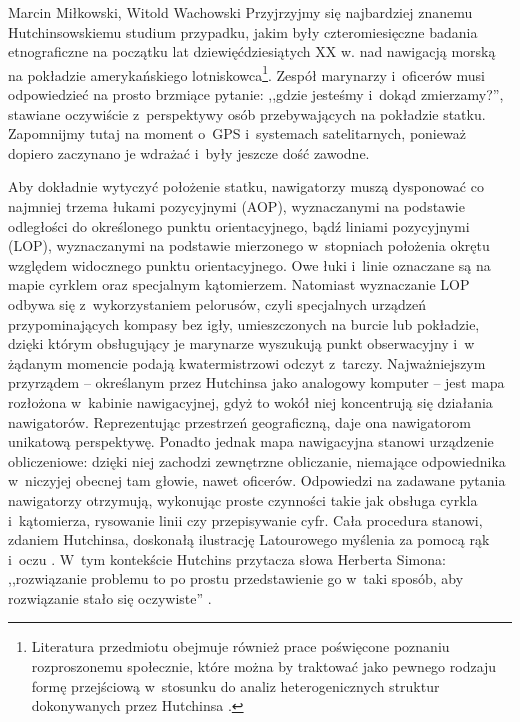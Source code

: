 \begin{artplenv2auth}{Marcin Miłkowski, Witold Wachowski}
Przyjrzyjmy się najbardziej znanemu Hutchinsowskiemu studium przypadku, jakim były czteromiesięczne badania etnograficzne na początku lat dziewięćdziesiątych XX w. nad nawigacją morską na pokładzie amerykańskiego lotniskowca\footnote{Literatura przedmiotu obejmuje również prace poświęcone poznaniu rozproszonemu społecznie, które można by traktować jako pewnego rodzaju formę przejściową w~stosunku do analiz heterogenicznych struktur dokonywanych przez Hutchinsa
\parencites[][]{roberts_self-management_1964}[][]{salomon_distributed_1993}. %
 }. Zespół marynarzy i~oficerów musi odpowiedzieć na prosto brzmiące pytanie: ,,gdzie jesteśmy i~dokąd zmierzamy?'', stawiane oczywiście z~perspektywy osób przebywających na pokładzie statku. Zapomnijmy tutaj na moment o~GPS i~systemach satelitarnych, ponieważ dopiero zaczynano je wdrażać i~były jeszcze dość zawodne.

Aby dokładnie wytyczyć położenie statku, nawigatorzy muszą dysponować co najmniej trzema łukami pozycyjnymi (AOP), wyznaczanymi na podstawie odległości do określonego punktu orientacyjnego, bądź liniami pozycyjnymi (LOP), wyznaczanymi na podstawie mierzonego w~stopniach położenia okrętu względem widocznego punktu orientacyjnego. Owe łuki i~linie oznaczane są na mapie cyrklem oraz specjalnym kątomierzem. Natomiast wyznaczanie LOP odbywa się z~wykorzystaniem pelorusów, czyli specjalnych urządzeń przypominających kompasy bez igły, umieszczonych na burcie lub pokładzie, dzięki którym obsługujący je marynarze wyszukują punkt obserwacyjny i~w żądanym momencie podają kwatermistrzowi odczyt z~tarczy. Najważniejszym przyrządem -- określanym przez Hutchinsa jako analogowy komputer -- jest mapa rozłożona w~kabinie nawigacyjnej, gdyż to wokół niej koncentrują się działania nawigatorów. Reprezentując przestrzeń geograficzną, daje ona nawigatorom unikatową perspektywę. Ponadto jednak mapa nawigacyjna stanowi urządzenie obliczeniowe: dzięki niej zachodzi zewnętrzne obliczanie, niemające odpowiednika w~niczyjej obecnej tam głowie, nawet oficerów. Odpowiedzi na zadawane pytania nawigatorzy otrzymują, wykonując proste czynności takie jak obsługa cyrkla i~kątomierza, rysowanie linii czy przepisywanie cyfr. Cała procedura stanowi, zdaniem Hutchinsa, doskonałą ilustrację Latourowego myślenia za pomocą rąk i~oczu
\parencite[][s.~142–143]{hutchins_cognition_1995}. %
 W~tym kontekście Hutchins przytacza słowa Herberta Simona: ,,rozwiązanie problemu to po prostu przedstawienie go w~taki sposób, aby rozwiązanie stało się oczywiste'' 
\parencite[][s.~117]{hutchins_cognition_1995}.%



\end{artplenv2auth}
